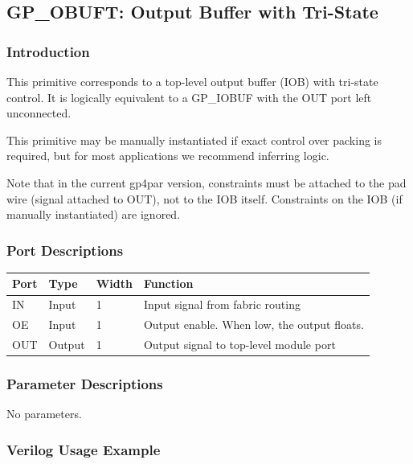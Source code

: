 \documentclass{article}
\begin{document}

\pagebreak
\subsection{GP\_OBUFT: Output Buffer with Tri-State}

\subsubsection{Introduction}
This primitive corresponds to a top-level output buffer (IOB) with tri-state control. It is logically equivalent to a 
GP\_IOBUF with the OUT port left unconnected.

This primitive may be manually instantiated if exact control over packing is required, but for most applications we 
recommend inferring logic.

Note that in the current gp4par version, constraints must be attached to the pad wire (signal attached to OUT), not 
to the IOB itself. Constraints on the IOB (if manually instantiated) are ignored.

\subsubsection{Port Descriptions}

\begin{tabularx}{4in}{|l|l|l|X|}
\hline
{\bfseries Port} & {\bfseries Type} & {\bfseries Width} & {\bfseries Function} \\
\hline
IN & Input & 1 & Input signal from fabric routing \\
\hline
OE & Input & 1 & Output enable. When low, the output floats. \\
\hline
OUT & Output & 1 & Output signal to top-level module port \\
\hline
\end{tabularx}

\subsubsection{Parameter Descriptions}

No parameters.

\subsubsection{Verilog Usage Example}
\end{document}
